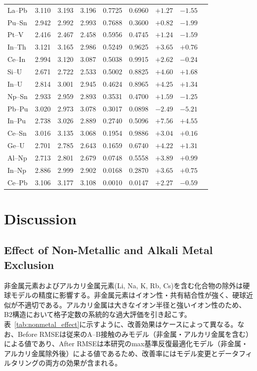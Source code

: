 \documentclass[a4paper,10pt,5p]{elsarticle}
\begin{document}
\begin{table}[htbp]
{\begin{tabular}{lcccccccc}
        La--Pb & 3.110 & 3.193 & 3.196 & 0.7725 & 0.6960 & $+1.27$ & $-1.55$ \\
        Pu--Sn & 2.942 & 2.992 & 2.993 & 0.7688 & 0.3600 & $+0.82$ & $-1.99$ \\
        Pt--V & 2.416 & 2.467 & 2.458 & 0.5956 & 0.4745 & $+1.24$ & $-1.59$ \\
        In--Th & 3.121 & 3.165 & 2.986 & 0.5249 & 0.9625 & $+3.65$ & $+0.76$ \\
        Ce--In & 2.994 & 3.120 & 3.087 & 0.5038 & 0.9915 & $+2.62$ & $-0.24$ \\
        Si--U & 2.671 & 2.722 & 2.533 & 0.5002 & 0.8825 & $+4.60$ & $+1.68$ \\
        In--U & 2.814 & 3.001 & 2.945 & 0.4624 & 0.8965 & $+4.25$ & $+1.34$ \\
        Np--Sn & 2.933 & 2.959 & 2.893 & 0.3531 & 0.4700 & $+1.59$ & $-1.25$ \\
        Pb--Pu & 3.020 & 2.973 & 3.078 & 0.3017 & 0.0898 & $-2.49$ & $-5.21$ \\
        In--Pu & 2.738 & 3.026 & 2.889 & 0.2740 & 0.5096 & $+7.56$ & $+4.55$ \\
        Ce--Sn & 3.016 & 3.135 & 3.068 & 0.1954 & 0.9886 & $+3.04$ & $+0.16$ \\
        Ge--U & 2.701 & 2.785 & 2.643 & 0.1659 & 0.6740 & $+4.22$ & $+1.31$ \\
        Al--Np & 2.713 & 2.801 & 2.679 & 0.0748 & 0.5558 & $+3.89$ & $+0.99$ \\
        In--Np & 2.886 & 2.999 & 2.902 & 0.0168 & 0.2870 & $+3.65$ & $+0.75$ \\
        Ce--Pb & 3.106 & 3.177 & 3.108 & 0.0010 & 0.0147 & $+2.27$ & $-0.59$ \\
        \bottomrule
    \end{tabular}
    }
\end{table}


\section{Discussion}

\subsection{Effect of Non-Metallic and Alkali Metal Exclusion}

非金属元素およびアルカリ金属元素(Li, Na, K, Rb, Cs)を含む化合物の除外は硬球モデルの精度に影響する。非金属元素はイオン性・共有結合性が強く、硬球近似が不適切である。アルカリ金属は大きなイオン半径と強いイオン性のため、B2構造において格子定数の系統的な過大評価を引き起こす。表~\ref{tab:nonmetal_effect}に示すように、改善効果はケースによって異なる。なお、Before RMSEは従来のA--B接触のみモデル（非金属・アルカリ金属を含む）による値であり、After RMSEは本研究のmax基準反復最適化モデル（非金属・アルカリ金属除外後）による値であるため、改善率にはモデル変更とデータフィルタリングの両方の効果が含まれる。
\end{document}
